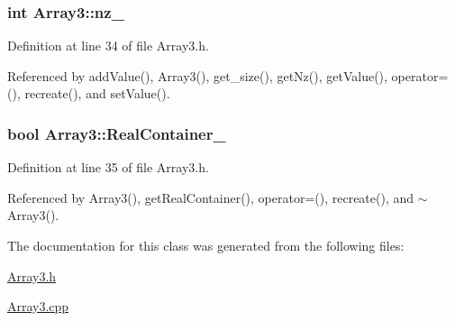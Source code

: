 \subsubsection[{nz\_\-}]{\setlength{\rightskip}{0pt plus 5cm}int {\bf Array3::nz\_\-}}\label{classArray3_a4ccb3e4d630c2bfa4c0ef929c6932c54}


Definition at line 34 of file Array3.h.



Referenced by addValue(), Array3(), get\_\-size(), getNz(), getValue(), operator=(), recreate(), and setValue().

\subsubsection[{RealContainer\_\-}]{\setlength{\rightskip}{0pt plus 5cm}bool {\bf Array3::RealContainer\_\-}}\label{classArray3_af3a70b601302d0219c86118ec831b858}


Definition at line 35 of file Array3.h.



Referenced by Array3(), getRealContainer(), operator=(), recreate(), and $\sim$Array3().



The documentation for this class was generated from the following files:\begin{DoxyCompactItemize}
\item 
\hyperlink{Array3_8h}{Array3.h}\item 
\hyperlink{Array3_8cpp}{Array3.cpp}\end{DoxyCompactItemize}
